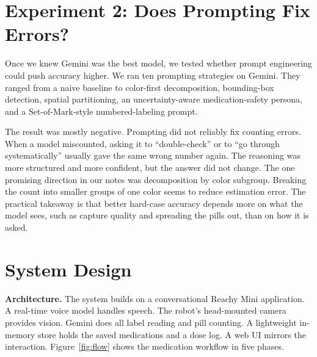 \documentclass[10pt,twocolumn]{article}
\begin{document}
\section{Experiment 2: Does Prompting Fix Errors?}\label{sec:exp2}
Once we knew Gemini was the best model, we tested whether prompt engineering could
push accuracy higher. We ran ten prompting strategies on Gemini. They ranged from a
naive baseline to color-first decomposition, bounding-box detection, spatial
partitioning, an uncertainty-aware medication-safety persona, and a
Set-of-Mark-style numbered-labeling prompt.

The result was mostly negative. Prompting did not reliably fix counting errors. When
a model miscounted, asking it to ``double-check'' or to ``go through systematically''
usually gave the same wrong number again. The reasoning was more structured and more
confident, but the answer did not change. The one promising direction in our notes
was decomposition by color subgroup. Breaking the count into smaller groups of one
color seems to reduce estimation error. The practical takeaway is that better
hard-case accuracy depends more on what the model sees, such as capture quality and
spreading the pills out, than on how it is asked.

\section{System Design}\label{sec:system}
\textbf{Architecture.} The system builds on a conversational Reachy Mini
application. A real-time voice model handles speech. The robot's head-mounted camera
provides vision. Gemini does all label reading and pill counting. A lightweight
in-memory store holds the saved medications and a dose log. A web UI mirrors the
interaction. Figure~\ref{fig:flow} shows the medication workflow in five phases.
\end{document}
